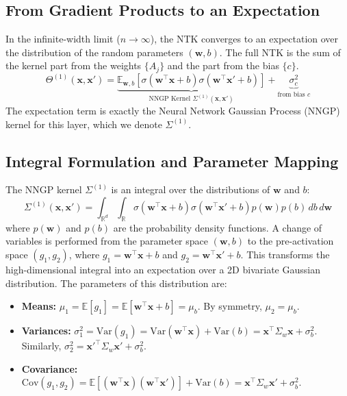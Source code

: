\documentclass[a4paper]{article}
\begin{document}
\subsection{From Gradient Products to an Expectation}
In the infinite-width limit ($n \to \infty$), the NTK converges to an expectation over the distribution of the random parameters $(\bm{w}, b)$. The full NTK is the sum of the kernel part from the weights $\{A_j\}$ and the part from the bias $\{c\}$.
\begin{equation}
\label{eq:ntk_expectation}
    \Theta^{(1)}(\bm{x}, \bm{x}') = \underbrace{\mathbb{E}_{\bm{w},b} \left[ \sigma(\bm{w}^\top \bm{x} + b)\sigma(\bm{w}^\top \bm{x}' + b) \right]}_{\text{NNGP Kernel } \Sigma^{(1)}(\bm{x}, \bm{x}')} + \underbrace{\sigma_c^2}_{\text{from bias } c}
\end{equation}
The expectation term is exactly the Neural Network Gaussian Process (NNGP) kernel for this layer, which we denote $\Sigma^{(1)}$.

\subsection{Integral Formulation and Parameter Mapping}
The NNGP kernel $\Sigma^{(1)}$ is an integral over the distributions of $\bm{w}$ and $b$:
\begin{equation}
    \Sigma^{(1)}(\bm{x}, \bm{x}') = \int_{\mathbb{R}^d} \int_{\mathbb{R}} \sigma(\bm{w}^\top \bm{x} + b)\sigma(\bm{w}^\top \bm{x}' + b) p(\bm{w})p(b) \,db \,d\bm{w}
\end{equation}
where $p(\bm{w})$ and $p(b)$ are the probability density functions. A change of variables is performed from the parameter space $(\bm{w}, b)$ to the pre-activation space $(g_1, g_2)$, where $g_1 = \bm{w}^\top \bm{x} + b$ and $g_2 = \bm{w}^\top \bm{x}' + b$. This transforms the high-dimensional integral into an expectation over a 2D bivariate Gaussian distribution. The parameters of this distribution are:
\begin{itemize}
    \item \textbf{Means:} $\mu_1 = \mathbb{E}[g_1] = \mathbb{E}[\bm{w}^\top\bm{x} + b] = \mu_b$. By symmetry, $\mu_2 = \mu_b$.
    \item \textbf{Variances:} $\sigma_1^2 = \text{Var}(g_1) = \text{Var}(\bm{w}^\top\bm{x}) + \text{Var}(b) = \bm{x}^\top \Sigma_w \bm{x} + \sigma_b^2$. Similarly, $\sigma_2^2 = {\bm{x}'}^\top \Sigma_w \bm{x}' + \sigma_b^2$.
    \item \textbf{Covariance:} $\text{Cov}(g_1, g_2) = \mathbb{E}[(\bm{w}^\top\bm{x})(\bm{w}^\top\bm{x}')] + \text{Var}(b) = \bm{x}^\top \Sigma_w \bm{x}' + \sigma_b^2$.
\end{itemize}
\end{document}
